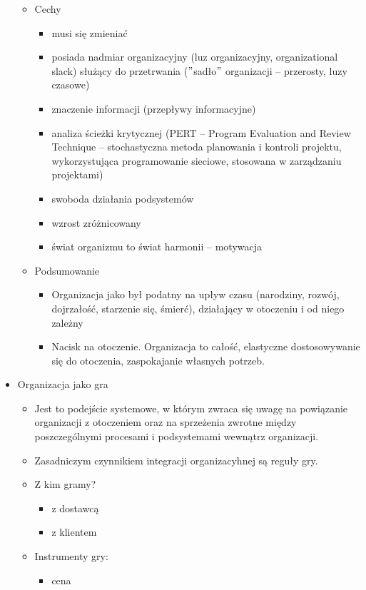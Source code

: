 \documentclass[a4paper,10pt]{report}
\begin{document}
\begin{itemize}
\begin{itemize}
\begin{itemize}
		\end{itemize}
		\item Cechy
		\begin{itemize}
			\item musi się zmieniać
			\item posiada nadmiar organizacyjny (luz organizacyjny, organizational slack) służący do przetrwania ($"$sadło$"$ organizacji -- przerosty, luzy czasowe)
			\item znaczenie informacji (przepływy informacyjne)
			\item analiza ścieżki krytycznej (PERT -- Program Evaluation and Review Technique -- stochastyczna metoda planowania i kontroli projektu, wykorzystująca programowanie sieciowe, stosowana w zarządzaniu projektami)
			\item swoboda działania podsystemów
			\item wzrost zróżnicowany
			\item świat organizmu to świat harmonii -- motywacja
		\end{itemize}
		\item Podsumowanie
		\begin{itemize}
			\item Organizacja jako był podatny na upływ czasu (narodziny, rozwój, dojrzałość, starzenie się, śmierć), działający w otoczeniu i od niego zależny
			\item Nacisk na otoczenie. Organizacja to całość, elastyczne dostosowywanie się do otoczenia, zaspokajanie własnych potrzeb.
		\end{itemize}
	\end{itemize}
	\item Organizacja jako gra
	\begin{itemize}
		\item Jest to podejście systemowe, w którym zwraca się uwagę na powiązanie organizacji z otoczeniem oraz na sprzeżenia zwrotne między poszczególnymi procesami i podsystemami wewnątrz organizacji. 
		\item Zasadniczym czynnikiem integracji organizacyhnej są reguły gry.
		\item Z kim gramy?
		\begin{itemize}
			\item z dostawcą
			\item z klientem
		\end{itemize}
		\item Instrumenty gry:
		\begin{itemize}
			\item cena

\end{itemize}
\end{itemize}
\end{itemize}
\end{document}
